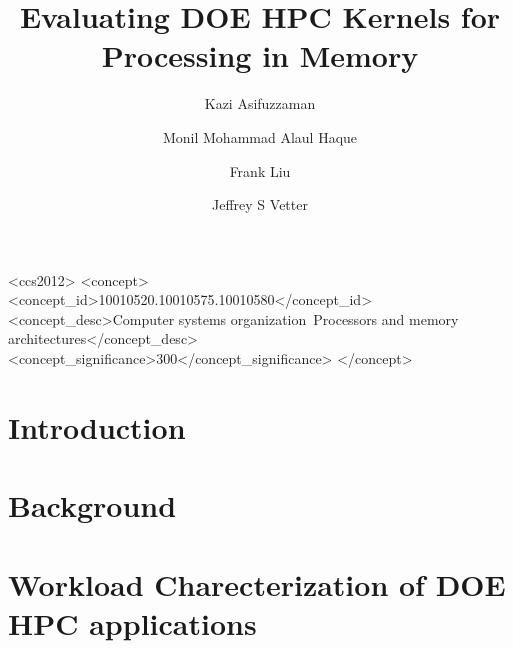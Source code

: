 \documentclass[format=sigconf, review=false, anonymous=false]{acmart}
\begin{document}
\title{Evaluating DOE HPC Kernels for Processing in Memory}


\author{Kazi Asifuzzaman}

\author{Monil Mohammad Alaul Haque}

\author{Frank Liu}

\author{Jeffrey S Vetter}



\renewcommand{\shortauthors}{}

\begin{CCSXML}

<ccs2012>
<concept>
<concept_id>10010520.10010575.10010580</concept_id>
<concept_desc>Computer systems organization~Processors and memory architectures</concept_desc>
<concept_significance>300</concept_significance>
</concept>
\end{CCSXML}



\begin{abstract}
	 
\end{abstract}







\maketitle
\thispagestyle{empty}

\section{Introduction}
  

\section{Background}
  

\section{Workload Charecterization of DOE HPC applications}
\label{sec:workload}
  
\end{document}

